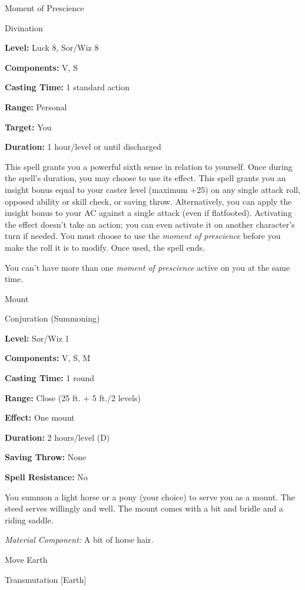 \documentclass{article}
\begin{document}
\vspace{12pt}
Moment of Prescience

Divination

\textbf{Level:} Luck 8, Sor/Wiz 8

\textbf{Components:} V, S

\textbf{Casting Time:} 1 standard action

\textbf{Range:} Personal

\textbf{Target:} You

\textbf{Duration:} 1 hour/level or until discharged

This spell grants you a powerful sixth sense in relation to yourself. Once during 
the spell's duration, you may choose to use its effect. This spell grants you an 
insight bonus equal to your caster level (maximum +25) on any single attack roll, 
opposed ability or skill check, or saving throw. Alternatively, you can apply the 
insight bonus to your AC against a single attack (even if flatfooted). Activating 
the effect doesn't take an action; you can even activate it on another character's 
turn if needed. You must choose to use the \textit{moment of prescience }before 
you make the roll it is to modify. Once used, the spell ends.

You can't have more than one \textit{moment of prescience }active on you at the 
same time.

\vspace{12pt}
Mount

Conjuration (Summoning)

\textbf{Level:} Sor/Wiz 1

\textbf{Components:} V, S, M

\textbf{Casting Time:} 1 round

\textbf{Range:} Close (25 ft. + 5 ft./2 levels)

\textbf{Effect:} One mount

\textbf{Duration:} 2 hours/level (D)

\textbf{Saving Throw:} None

\textbf{Spell Resistance:} No

You summon a light horse or a pony (your choice) to serve you as a mount. The steed 
serves willingly and well. The mount comes with a bit and bridle and a riding saddle.

\textit{Material Component: }A bit of horse hair.

\vspace{12pt}
Move Earth

Transmutation [Earth]
\end{document}
